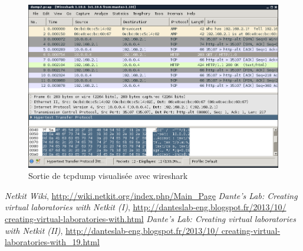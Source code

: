 \documentclass[frenchb, 11pt]{article}
\begin{document}
\begin{figure}[h!]
	\centering
	\includegraphics[scale=0.55]{wireshark.png}
	\caption{Sortie de tcpdump visualisée avec wireshark}
	\label{fig:wireshark}
\end{figure}
\newpage

\makeatletter
\renewcommand\refname{Ressources utilisées}
\renewcommand\@biblabel[1]{\textbullet}
\makeatother
\begin{thebibliography}{5}
 \emph{Netkit Wiki}, \href{http://wiki.netkit.org/index.php/Main_Page}{http://wiki.netkit.org/index.php/Main\_Page}
 \emph{Dante's Lab: Creating virtual laboratories with Netkit (I)}, \href{http://danteslab-eng.blogspot.fr/2013/10/creating-virtual-laboratories-with.html}{http://danteslab-eng.blogspot.fr/2013/10/ creating-virtual-laboratories-with.html}
 \emph{Dante's Lab: Creating virtual laboratories with Netkit (II)}, \href{http://danteslab-eng.blogspot.fr/2013/10/creating-virtual-laboratories-with_19.html}{http://danteslab-eng.blogspot.fr/2013/10/ creating-virtual-laboratories-with\_19.html}
\end{thebibliography}
\end{document}
